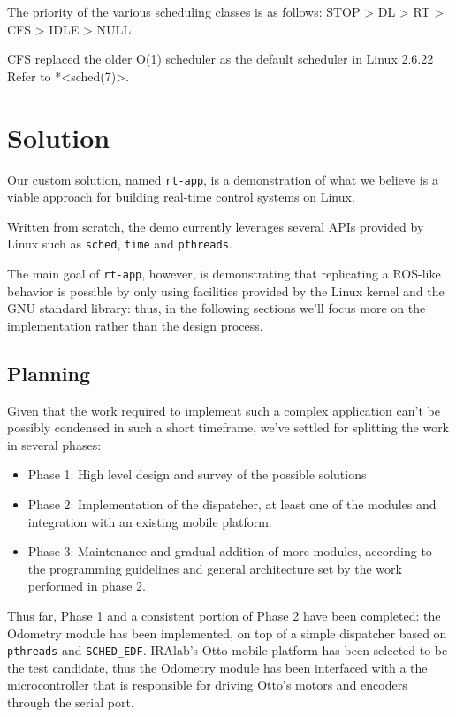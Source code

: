 \documentclass[a4paper,12pt]{report}
\begin{document}
The priority of the various scheduling classes is as follows:
STOP > DL > RT > CFS > IDLE > NULL

CFS replaced the older O(1) scheduler as the default scheduler in Linux 2.6.22 %
Refer to *<sched(7)>.

\newpage
\chapter{Solution}

Our custom solution, named \texttt{rt-app}, is a demonstration of what we believe is a viable approach for building real-time control systems on Linux.

Written from scratch, the demo currently leverages several APIs provided by Linux such as \texttt{sched}, \texttt{time} and \texttt{pthreads}.

The main goal of \texttt{rt-app}, however, is demonstrating that replicating a ROS-like behavior is possible by only using facilities provided by the Linux kernel and the GNU standard library: thus, in the following sections we'll focus more on the implementation rather than the design process.

\section{Planning}

Given that the work required to implement such a complex application can't be possibly condensed in such a short timeframe, we've settled for splitting the work in several phases:
\begin{itemize}
  \item Phase 1: High level design and survey of the possible solutions
  \item Phase 2: Implementation of the dispatcher, at least one of the modules and integration with an existing mobile platform.
  \item Phase 3: Maintenance and gradual addition of more modules, according to the programming guidelines and general architecture set by the work performed in phase 2.
\end{itemize}

Thus far, Phase 1 and a consistent portion of Phase 2 have been completed: the Odometry module has been implemented, on top of a simple dispatcher based on \texttt{pthreads} and \texttt{SCHED\_EDF}. IRAlab's Otto\cite{fdila-bs-otto} mobile platform has been selected to be the test candidate, thus the Odometry module has been interfaced with a the microcontroller that is responsible for driving Otto's motors and encoders through the serial port.
\end{document}
